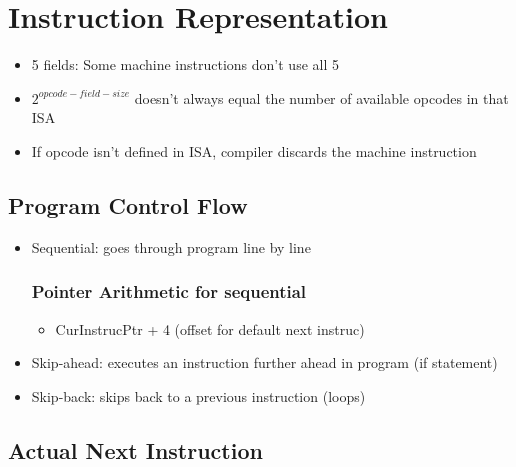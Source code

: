 \documentclass{article}
\begin{document}
\section{Instruction Representation}
    
    \begin{itemize}
        \item 5 fields: Some machine instructions don't use all 5
        
        
        \item $2^{opcode-field-size}$ doesn't always equal the number of available opcodes in that ISA
        
        \item If opcode isn't defined in ISA, compiler discards the machine instruction
        
    \end{itemize}

    

    \subsection{Program Control Flow}
    
    \begin{itemize}
        \item Sequential: goes through program line by line
        
        \subsubsection{Pointer Arithmetic for sequential}
        
        \begin{itemize}
            \item CurInstrucPtr + 4 (offset for default next instruc)
        \end{itemize}
            
        
        \item Skip-ahead: executes an instruction further ahead in program (if statement)
        
        \item Skip-back: skips back to a previous instruction (loops)
    \end{itemize}
 
 \subsection{Actual Next Instruction}
 
\end{document}

